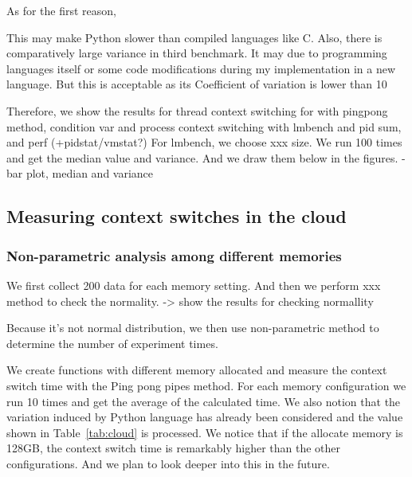 As for the first reason, 

This may make Python slower than compiled languages like C. Also, there is comparatively large variance in third benchmark. It may due to programming languages itself or some code modifications during my implementation in a new language. But this is acceptable as its Coefficient of variation  is lower than 10%





Therefore, we show the results for thread context switching for with pingpong method, condition var and process context switching with lmbench and pid sum, and perf (+pidstat/vmstat?)
For lmbench, we choose xxx size. We run 100 times and get the median value and variance. And we draw them below in the figures. - bar plot, median and variance


\subsection{Measuring context switches in the cloud}

\subsubsection{Non-parametric analysis among different memories}

We first collect 200 data for each memory setting. And then we perform xxx method to check the normality. 
-> show the results for checking normallity

Because it's not normal distribution, we then use non-parametric method to determine the number of experiment times. 



We create functions with different memory allocated and measure the context switch time with the Ping pong pipes method.
For each memory configuration we run 10 times and get the average of the calculated time. 
We also notion that the variation induced by Python language has already been considered and the value shown in Table~\ref{tab:cloud} is processed.
We notice that if the allocate memory is 128GB, the context switch time is remarkably higher than the other configurations.
And we plan to look deeper into this in the future.


